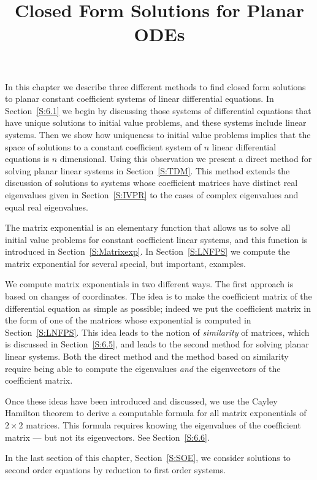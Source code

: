 \documentclass{ximera}
\title{Closed Form Solutions for Planar ODEs}
\begin{document}
\begin{abstract}
\end{abstract}
\maketitle


\label{Chap:Planar}

\normalsize

In this chapter we describe three different methods to find closed form
solutions to planar constant coefficient systems of linear differential
equations.  In Section~\ref{S:6.1} we begin by discussing those systems of
differential equations that have unique solutions to initial value problems,
and these systems include linear systems.  Then we show how uniqueness to
initial value problems implies that the space of solutions to a constant
coefficient system of $n$ linear differential equations is $n$ dimensional.
Using this observation we present a direct method for solving planar linear
systems in Section~\ref{S:TDM}.  This method extends the discussion of
solutions to systems whose coefficient matrices have distinct real
eigenvalues given in Section~\ref{S:IVPR} to the cases of complex
eigenvalues and equal real eigenvalues.

The matrix exponential is an elementary function that allows us to solve
all initial value problems for constant coefficient linear systems, and
this function is introduced in Section~\ref{S:Matrixexp}.  In
Section~\ref{S:LNFPS} we compute the matrix exponential for several
special, but important, examples.

We compute matrix exponentials in two different ways.  The first approach is
based on changes of coordinates.  The idea is to make the coefficient matrix
of the differential equation as simple as possible; indeed we put the
coefficient matrix in the form of one of the matrices whose exponential is
computed in Section~\ref{S:LNFPS}.  This idea leads to the notion of
{\em similarity\/} of matrices, which is discussed in Section~\ref{S:6.5}, and
leads to the second method for solving planar linear systems. Both the direct
method and the method based on similarity require being able to compute the
eigenvalues {\em and\/} the eigenvectors of the coefficient matrix.

Once these ideas have been introduced and discussed, we use the
Cayley Hamilton theorem to derive a computable formula for all matrix
exponentials of $2\times 2$ matrices.  This formula requires knowing
the eigenvalues of the coefficient matrix --- but not its eigenvectors.
See Section~\ref{S:6.6}.

In the last section of this chapter, Section~\ref{S:SOE}, we consider
solutions to second order equations by reduction to first order systems.
\end{document}

